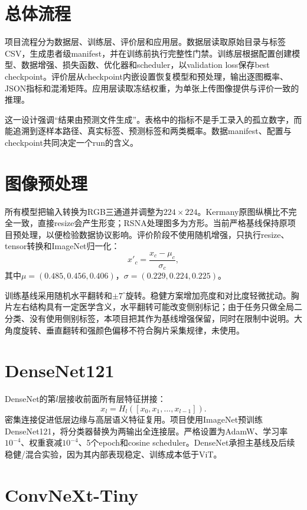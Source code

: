 \section{总体流程}

项目流程分为数据层、训练层、评价层和应用层。数据层读取原始目录与标签CSV，生成患者级manifest，并在训练前执行完整性门禁。训练层根据配置创建模型、数据增强、损失函数、优化器和scheduler，以validation loss保存best checkpoint。评价层从checkpoint内嵌设置恢复模型和预处理，输出逐图概率、JSON指标和混淆矩阵。应用层读取冻结权重，为单张上传图像提供与评价一致的推理。

这一设计强调“结果由预测文件生成”。表格中的指标不是手工录入的孤立数字，而能追溯到逐样本路径、真实标签、预测标签和两类概率。数据manifest、配置与checkpoint共同决定一个run的含义。

\section{图像预处理}

所有模型把输入转换为RGB三通道并调整为$224\times224$。Kermany原图纵横比不完全一致，直接resize会产生形变；RSNA处理图多为方形。当前严格基线保持原项目预处理，以便检验数据协议影响。评价阶段不使用随机增强，只执行resize、tensor转换和ImageNet归一化：
\begin{equation}
x'_{c}=\frac{x_c-\mu_c}{\sigma_c},
\end{equation}
其中$\mu=(0.485,0.456,0.406)$，$\sigma=(0.229,0.224,0.225)$。

训练基线采用随机水平翻转和$\pm7^\circ$旋转。稳健方案增加亮度和对比度轻微扰动。胸片左右结构具有一定医学含义，水平翻转可能改变侧别标记；由于任务只做全局二分类、没有使用侧别标签，本项目把其作为基线增强保留，同时在限制中说明。大角度旋转、垂直翻转和强颜色偏移不符合胸片采集规律，未使用。

\section{DenseNet121}

DenseNet的第$l$层接收前面所有层特征拼接：
\begin{equation}
x_l=H_l([x_0,x_1,\ldots,x_{l-1}]).
\end{equation}
密集连接促进低层边缘与高层语义特征复用。项目使用ImageNet预训练DenseNet121，将分类器替换为两输出全连接层。严格设置为AdamW、学习率$10^{-4}$、权重衰减$10^{-4}$、5个epoch和cosine scheduler。DenseNet承担主基线及后续稳健/混合实验，因为其内部表现稳定、训练成本低于ViT。

\section{ConvNeXt-Tiny}

